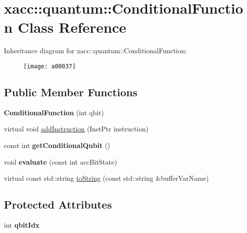 \hypertarget{a00037}{}\section{xacc\+:\+:quantum\+:\+:Conditional\+Function Class Reference}
\label{a00037}
Inheritance diagram for xacc\+:\+:quantum\+:\+:Conditional\+Function\+:\begin{figure}[H]
\begin{center}
\leavevmode
\texttt{[image: a00037]}
\end{center}
\end{figure}
\subsection*{Public Member Functions}
\begin{DoxyCompactItemize}
\item 
{\bfseries Conditional\+Function} (int qbit)\hypertarget{a00037_aa28610a08ae04d62ccdd8359433100c3}{}\label{a00037_aa28610a08ae04d62ccdd8359433100c3}

\item 
virtual void \hyperlink{a00037_a6aedad20f96390880efdc0a476b3273f}{add\+Instruction} (Inst\+Ptr instruction)
\item 
const int {\bfseries get\+Conditional\+Qubit} ()\hypertarget{a00037_a804317333b6677a041a3071b5108c0df}{}\label{a00037_a804317333b6677a041a3071b5108c0df}

\item 
void {\bfseries evaluate} (const int acc\+Bit\+State)\hypertarget{a00037_a709c236a5beb62d9a3bd5265196fb6c9}{}\label{a00037_a709c236a5beb62d9a3bd5265196fb6c9}

\item 
virtual const std\+::string \hyperlink{a00037_aca7a5f849fece6fc28a904efee9a3370}{to\+String} (const std\+::string \&buffer\+Var\+Name)
\end{DoxyCompactItemize}
\subsection*{Protected Attributes}
\begin{DoxyCompactItemize}
\item 
int {\bfseries qbit\+Idx}\hypertarget{a00037_a0310536801417c0eded28a4dea1efa44}{}\label{a00037_a0310536801417c0eded28a4dea1efa44}

\end{DoxyCompactItemize}
